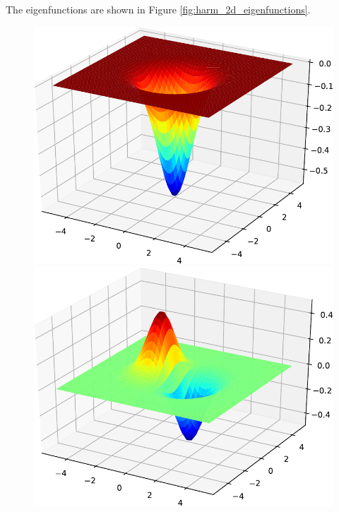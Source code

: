 The eigenfunctions are shown in Figure \ref{fig:harm_2d_eigenfunctions}.

\begin{figure}[H]
{\centering
\includegraphics[scale=0.3]{../codes/sch_2d/IMG_harmonic_psi_1.pdf}\\
\includegraphics[scale=0.3]{../codes/sch_2d/IMG_harmonic_psi_2.pdf}%
}
\end{figure}

